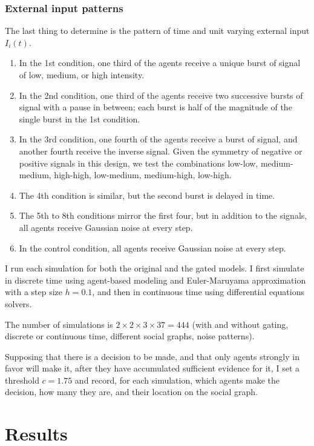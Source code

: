 \documentclass[]{article}
\begin{document}
\subsubsection{External input patterns}
The last thing to determine is the pattern of time and unit varying external input $I_i(t)$. 
\begin{enumerate}
	\item In the 1st condition, one third of the agents receive a unique burst of signal of low, medium, or high intensity. 
	\item In the 2nd condition, one third of the agents receive two successive bursts of signal with a pause in between; each burst is half of the magnitude of the single burst in the 1st condition.
	\item In the 3rd condition, one fourth of the agents receive a burst of signal, and another fourth receive the inverse signal. Given the symmetry of negative or positive signals in this design, we test the combinations low-low, medium-medium, high-high, low-medium, medium-high, low-high. 
	\item The 4th condition is similar, but the second burst is delayed in time.
	\item The 5th to 8th conditions mirror the first four, but in addition to the signals, all agents receive Gaussian noise at every step.
	\item In the control condition, all agents receive Gaussian noise at every step.
\end{enumerate}

I run each simulation for both the original and the gated models. I first simulate in discrete time using agent-based modeling and Euler-Maruyama approximation with a step size $h = 0.1$, and then in continuous time using differential equations solvers.

The number of simulations is $2 \times 2 \times 3 \times 37 = 444$ (with and without gating, discrete or continuous time, different social graphs, noise patterns).

Supposing that there is a decision to be made, and that only agents strongly in favor will make it, after they have accumulated sufficient evidence for it, I set a threshold $c = 1.75$ and record, for each simulation, which agents make the decision, how many they are, and their location on the social graph.

\section{Results}
\end{document}
